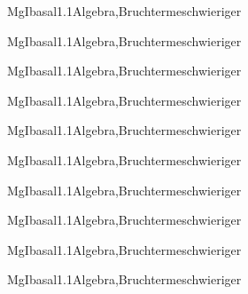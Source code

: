 \documentclass[12pt]{article}
\begin{document}
    \begin{Add}{MgI}{basal1.1}{Algebra,Bruchterme}{schwieriger}
    \solution{ }
    \end{Add}
    \begin{Add}{MgI}{basal1.1}{Algebra,Bruchterme}{schwieriger}
    \end{Add}
    

    \begin{Add}{MgI}{basal1.1}{Algebra,Bruchterme}{schwieriger}
    \solution{ }
    \end{Add}
    \begin{Add}{MgI}{basal1.1}{Algebra,Bruchterme}{schwieriger}
    \end{Add}
    

    \begin{Add}{MgI}{basal1.1}{Algebra,Bruchterme}{schwieriger}
    \solution{ }
    \end{Add}
    \begin{Add}{MgI}{basal1.1}{Algebra,Bruchterme}{schwieriger}
    \end{Add}
    

    \begin{Add}{MgI}{basal1.1}{Algebra,Bruchterme}{schwieriger}
    \solution{ }
    \end{Add}
    \begin{Add}{MgI}{basal1.1}{Algebra,Bruchterme}{schwieriger}
    \end{Add}
    

    \begin{Add}{MgI}{basal1.1}{Algebra,Bruchterme}{schwieriger}
    \solution{ }
    \end{Add}
    \begin{Add}{MgI}{basal1.1}{Algebra,Bruchterme}{schwieriger}
    \end{Add}
    
\end{document}
